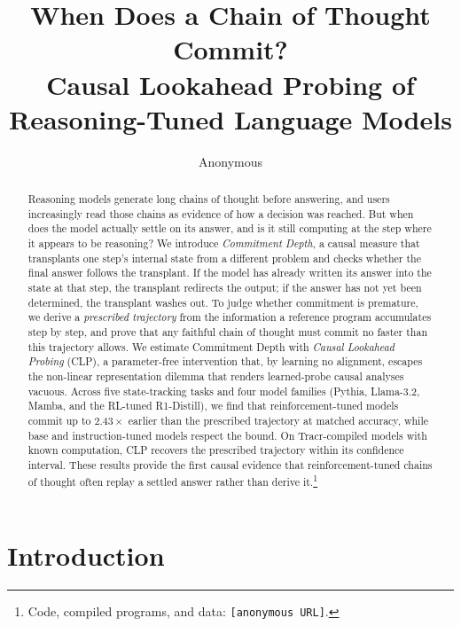 \documentclass[11pt]{article}
\title{When Does a Chain of Thought Commit?\\
       Causal Lookahead Probing of Reasoning-Tuned Language Models}
\author{Anonymous}
\begin{document}
\maketitle

\begin{abstract}
Reasoning models generate long chains of thought before answering, and users
increasingly read those chains as evidence of how a decision was reached. But
when does the model actually settle on its answer, and is it still computing
at the step where it appears to be reasoning? We introduce \emph{Commitment
Depth}, a causal measure that transplants one step's internal state from a
different problem and checks whether the final answer follows the transplant.
If the model has already written its answer into the state at that step, the
transplant redirects the output; if the answer has not yet been determined,
the transplant washes out. To judge whether commitment is premature, we
derive a \emph{prescribed trajectory} from the information a reference program
accumulates step by step, and prove that any faithful chain of thought must
commit no faster than this trajectory allows. We estimate Commitment Depth
with \emph{Causal Lookahead Probing} (CLP), a parameter-free intervention
that, by learning no alignment, escapes the non-linear representation dilemma
that renders learned-probe causal analyses vacuous. Across five
state-tracking tasks and four model families (Pythia, Llama-3.2, Mamba, and
the RL-tuned R1-Distill), we find that reinforcement-tuned models commit up
to $2.43\times$ earlier than the prescribed trajectory at matched accuracy,
while base and instruction-tuned models respect the bound. On
Tracr-compiled models with known computation, CLP recovers the prescribed
trajectory within its confidence interval. These results provide the first
causal evidence that reinforcement-tuned chains of thought often replay a
settled answer rather than derive it.\footnote{Code, compiled programs, and data: \texttt{\small[anonymous URL]}.}
\end{abstract}

\section{Introduction}
\end{document}

